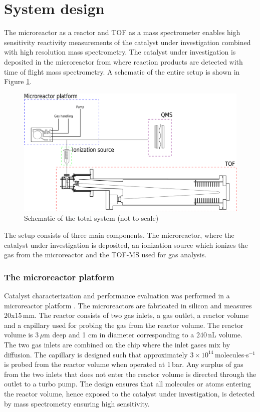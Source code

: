 \documentclass[aip,rsi]{revtex4-1}
\begin{document}
\section{System design}
The microreactor as a reactor and TOF as a mass spectrometer enables high sensitivity reactivity measurements of the catalyst under investigation combined with high resolution mass spectrometry. The catalyst under investigation is deposited in the microreactor from where reaction products are detected with time of flight mass spectrometry. A schematic of the entire setup is shown in Figure \ref{fig:TOF_microreactor}.
\begin{figure}
 \includegraphics[width=14cm]{TOF_microreactor.png}%
 \caption{Schematic of the total system (not to scale)\label{fig:TOF_microreactor}}%
\end{figure}
The setup consists of three main components. The microreactor, where the catalyst under investigation is deposited, an ionization source which ionizes the gas from the microreactor and the TOF-MS used for gas analysis. 

\subsubsection{The microreactor platform}
Catalyst characterization and performance evaluation was performed in a microreactor platform \cite{Henriksen2009}. The microreactors are fabricated in silicon and measures 20x15\,mm. The reactor consists of two gas inlets, a gas outlet, a reactor volume and a capillary used for probing the gas from the reactor volume. The reactor volume is 3\,$\mu$m deep and 1 cm in diameter corresponding to a 240\,nL volume. The two gas inlets are combined on the chip where the inlet gases mix by diffusion. The capillary is designed such that approximately $3\times10^{14}$\,molecules$\cdot$s$^{-1}$ is probed from the reactor volume when operated at 1\,bar. Any surplus of gas from the two inlets that does not enter the reactor volume is directed through the outlet to a turbo pump. The design ensures that all molecules or atoms entering the reactor volume, hence exposed to the catalyst under investigation, is detected by mass spectrometry ensuring high sensitivity.
\end{document}
